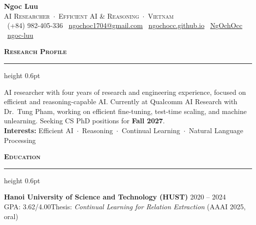 \documentclass{resume}
\renewcommand{\normalsize}{\fontsize{10.5}{12.9}\selectfont}
\renewcommand{\small}{\fontsize{9.7}{11.8}\selectfont}
\renewenvironment{rSection}[1]{%
  \vspace{0.45em}%
  {\color{accent}\large\scshape\bfseries #1}\par\vspace{0.12em}%
  {\color{accent}\hrule height 0.6pt}\vspace{0.25em}%
  \begin{list}{}{%
    \setlength{\leftmargin}{0em}%
    \setlength{\topsep}{0.3em}%
    \setlength{\partopsep}{0pt}%
    \setlength{\parsep}{0pt}%
    \setlength{\itemsep}{0pt}%
  }%
  \item[]%
}{%
  \end{list}%
}
\newcommand{\sep}{\hspace{0.6em}{\color{muted}$\vert$}\hspace{0.6em}}
\begin{document}
\normalsize


\begin{center}
  {\color{accent}\fontsize{26}{30}\selectfont\bfseries Ngoc Luu}\\[0.3em]
  {\color{muted}\scshape AI Researcher \,$\cdot$\, Efficient AI \& Reasoning \,$\cdot$\, Vietnam}\\[0.3em]
  \small
  \faPhone*\ (+84) 982-405-336 \sep
  \faEnvelope[regular]\ \href{mailto:ngochoc1704@gmail.com}{ngochoc1704@gmail.com} \sep
  \faGlobe\ \href{https://ngochocc.github.io/}{ngochocc.github.io} \sep
  \faGithub\ \href{https://github.com/NgOchOcc}{NgOchOcc} \sep
  \faLinkedin\ \href{https://www.linkedin.com/in/ng\%E1\%BB\%8Dc-l\%C6\%B0u-4b88b6263/}{ngoc-luu}
\end{center}
\vspace{-0.1em}


\begin{rSection}{Research Profile}
AI researcher with four years of research and engineering experience, focused on efficient and
reasoning-capable AI. Currently at Qualcomm AI Research with Dr.~Tung Pham, working on efficient
fine-tuning, test-time scaling, and machine unlearning. Seeking CS PhD positions for \textbf{Fall 2027}.\\[0.15em]
\textbf{Interests:} Efficient AI \,$\cdot$\, Reasoning \,$\cdot$\, Continual Learning \,$\cdot$\,
Natural Language Processing
\end{rSection}


\begin{rSection}{Education}
{\bfseries Hanoi University of Science and Technology (HUST)}\sep{\itshape Bachelor of Computer Science} \hfill {\color{muted}2020 -- 2024}\\
GPA: 3.62/4.00\sep Thesis: \emph{Continual Learning for Relation Extraction} (AAAI 2025, oral)
\end{rSection}
\end{document}
